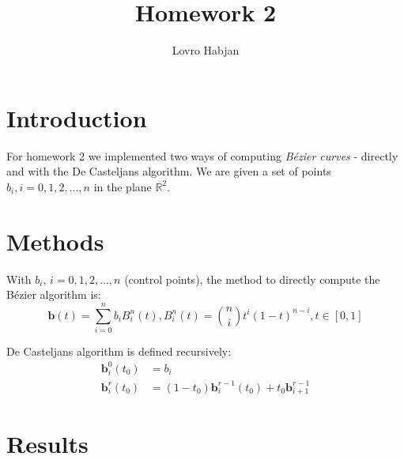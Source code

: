 \documentclass[]{article}
\title{Homework 2}
\author{Lovro Habjan}
\begin{document}
\maketitle


\section{Introduction}

For homework 2 we implemented two ways of computing \textit{B\'ezier curves} - directly and with the De Casteljans algorithm. We are given a set of points $b_i, i = 0, 1, 2, ..., n$ in the plane $\mathbb{R}^2$.


\section{Methods}

With $b_i$,  $i = 0, 1, 2, ..., n$ (control points), the method to directly compute the B\'ezier algorithm is:
\begin{equation*}
	\textbf{b}(t) = \sum_{i = 0}^{n} b_i B^n_i (t), B^n_i(t) = \binom{n}{i} t^i (1-t)^{n-i}, t \in [0, 1]
\end{equation*}

De Casteljans algorithm is defined recursively:
\begin{align*}
	\textbf{b}^0_i(t_0) &= b_i \\
	\textbf{b}^r_i(t_0) &= (1 - t_0) \textbf{b}^{r-1}_i(t_0) + t_0 \textbf{b}^{r-1}_{i+1}
\end{align*}

\section{Results}
\end{document}
